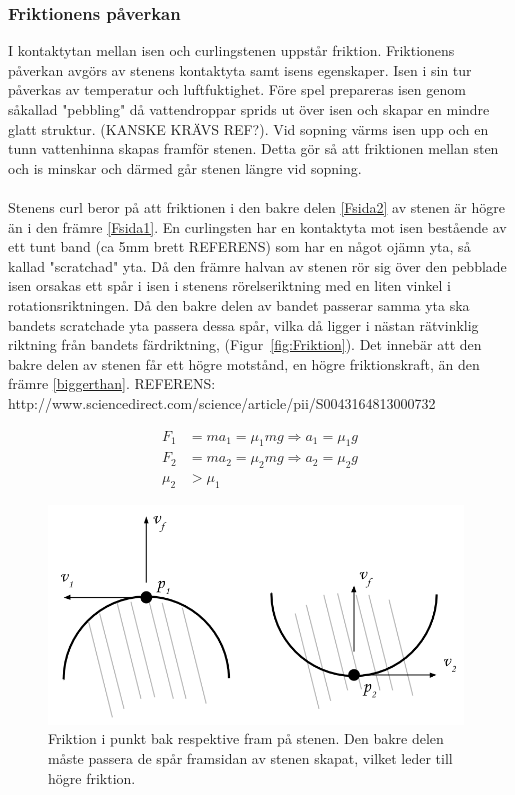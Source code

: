 \documentclass[11pt]{article} %
\begin{document}
\subsubsection{Friktionens påverkan}
I kontaktytan mellan isen och curlingstenen uppstår friktion. Friktionens påverkan avgörs av stenens kontaktyta samt isens egenskaper. Isen i sin tur påverkas av temperatur och luftfuktighet. Före spel prepareras isen genom såkallad "pebbling" då vattendroppar sprids ut över isen och skapar en mindre glatt struktur. (KANSKE KRÄVS REF?). 
Vid sopning värms isen upp och en tunn vattenhinna skapas framför stenen. Detta gör så att friktionen mellan sten och is minskar och därmed går stenen längre vid sopning.  
\\\\Stenens curl beror på att friktionen i den bakre delen \eqref{Fsida2} av stenen är högre än i den främre \eqref{Fsida1}.  
En curlingsten har en kontaktyta mot isen bestående av ett tunt band (ca 5mm brett REFERENS) som har en något ojämn yta, så kallad "scratchad" yta. Då den främre halvan av stenen rör sig över den pebblade isen orsakas ett spår i isen i stenens rörelseriktning med en liten vinkel i rotationsriktningen. Då den bakre delen av bandet passerar samma yta ska bandets scratchade yta passera dessa spår, vilka då ligger i nästan rätvinklig riktning från bandets färdriktning, (Figur~\ref{fig:Friktion}). Det innebär att den bakre delen av stenen får ett högre motstånd, en högre friktionskraft, än den främre \eqref{biggerthan}. 
REFERENS: http://www.sciencedirect.com/science/article/pii/S0043164813000732

 \begin{align}\label{Fsida1}
 F_1& = ma_1 = \mu_1 mg \Rightarrow a_1 = \mu_1 g \\\label{Fsida2}
 F_2& = ma_2 = \mu_2 mg \Rightarrow a_2 = \mu_2g \\\label{biggerthan}
 \mu_2& > \mu_1
 \end{align}

\begin{figure}[ht!]
\centering
\includegraphics[width=110mm]{Friktion_bakfram.png}
\caption{Friktion i punkt bak respektive fram på stenen. Den bakre delen måste passera de spår framsidan av stenen skapat, vilket leder till högre friktion.}
\label{fig:Friktion}
\label{overflow}
\end{figure}
\end{document}

